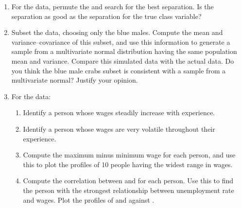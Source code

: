 \begin{enumerate}
\item
For the  data, permute the  and search for the best
separation. Is the separation as good as the separation for the true
class variable?
\item Subset the  data, choosing only the blue
males. Compute the mean and variance--covariance of this subset, and
use this information to generate a sample from a multivariate normal
distribution having the same population mean and variance.  Compare
this simulated data with the actual data. Do you think the blue male
crabs subset is consistent with a sample from a multivariate normal?
Justify your opinion.
\item For the  data:
\begin{enumerate}
\item Identify a person whose wages steadily increase with experience.
\item Identify a person whose wages are very volatile throughout their 
experience.
\item Compute the maximum minus minimum wage for each person, and use this to 
plot the profiles of 10 people having the widest range in wages.
\item Compute the correlation between  and  for each 
person.  Use this to find the person with the strongest relationship between
unemployment rate and wages. Plot the profiles of  and
 against .
\end{enumerate}


\end{enumerate}
